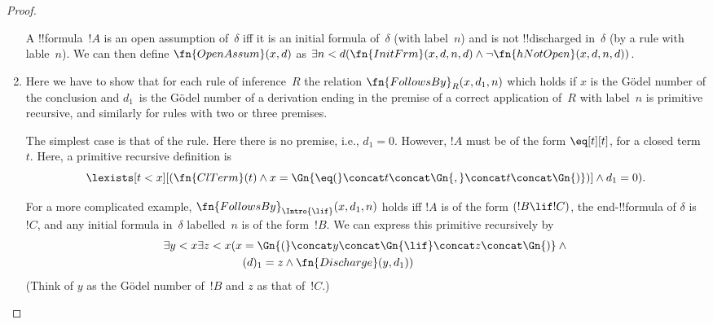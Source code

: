 \documentclass[../../../include/open-logic-section]{subfiles}
\begin{document}
\begin{proof}
\begin{enumerate}
  A !!{formula}~$!A$ is an open assumption of~$\delta$ iff it is an
  initial formula of~$\delta$ (with label~$n$) and is not
  !!{discharged} in~$\delta$ (by a rule with lable~$n$). We can then
  define $\fn{OpenAssum}(x, d)$ as $\exists n<d(\fn{InitFrm}(x,d,n,d)
  \land \lnot\fn{hNotOpen}(x, d, n, d))$.
\item Here we have to show that for each rule of inference~$R$ the
  relation $\fn{FollowsBy}_R(x, d_1, n)$ which holds if $x$ is the
  G\"odel number of the conclusion and $d_1$~is the G\"odel number of a
  derivation ending in the premise of a correct application of~$R$
  with label~$n$ is primitive recursive, and similarly for rules with
  two or three premises.

  The simplest case is that of the \Intro{\eq} rule. Here there is no
  premise, i.e., $d_1 = 0$.  However, $!A$ must be of the form
  $\eq[t][t]$, for a closed term~$t$. Here, a primitive recursive
  definition is
  \[
  \lexists[t<x][(\fn{ClTerm}(t) \land x = 
    \Gn{\eq(} \concat t \concat \Gn{,} \concat t \concat \Gn{)})]
  \land d_1 = 0).
  \]

  For a more complicated example, $\fn{FollowsBy}_{\Intro{\lif}}(x, d_1,
    n)$ holds iff $!A$ is of the form $(!B \lif !C)$, the
  end-!!{formula} of $\delta$ is~$!C$, and any initial formula
  in~$\delta$ labelled~$n$ is of the form~$!B$.  We can express this
  primitive recursively by
  \begin{align*}
  \exists y<x\exists z<x &(x = \Gn{(} \concat y \concat \Gn{\lif}
  \concat z\concat \Gn{)} \land {} \\
  & \quad(d)_1 = z \land \fn{Discharge}(y, d_1))
  \end{align*}
  (Think of $y$ as the G\"odel number of~$!B$ and $z$ as that
  of~$!C$.)


\end{enumerate}
\end{proof}
\end{document}
